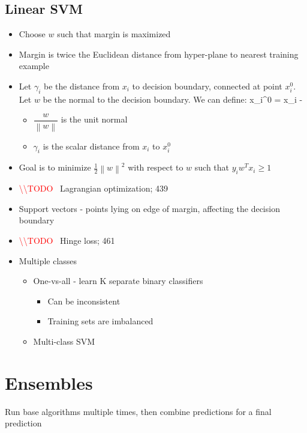 \documentclass[12pt]{article}
\newcommand{\norm}[1]{\left\lVert#1\right\rVert}
\newenvironment{eqn}{\equation\alignedat{3}}{\endalignedat\endequation}
\newcommand{\todo}[0]{\textcolor{red}{\textbackslash\textbackslash TODO \ }}
\begin{document}
\subsection{Linear SVM}

\begin{itemize}
	\item Choose $w$ such that margin is maximized
	\item Margin is twice the Euclidean distance from hyper-plane to nearest training example
	\item Let $\gamma_i$ be the distance from $x_i$ to decision boundary, connected at point $x_i^0$. Let $w$ be the normal to the decision boundary. We can define:
	\begin{eqn}
		x_i^0 = x_i - \frac{\gamma_i w}{\norm{w}}
	\end{eqn}
	\begin{itemize}
		\item $\dfrac{w}{\norm{w}}$ is the unit normal 
		\item $\gamma_i$ is the scalar distance from $x_i$ to $x_i^0$
	\end{itemize}
	\item Goal is to minimize $\frac{1}{2} \norm{w}^2$ with respect to $w$ such that $y_i w^T x_i \ge 1$ 
	\item \todo{Lagrangian optimization; 439}
	\item Support vectors - points lying on edge of margin, affecting the decision boundary
	\item \todo{Hinge loss; 461}
	\item Multiple classes 
	\begin{itemize}
		\item One-vs-all - learn K separate binary classifiers
		\begin{itemize}
			\item Can be inconsistent
			\item Training sets are imbalanced
		\end{itemize}
		\item Multi-class SVM
	\end{itemize}
\end{itemize}

\section{Ensembles}

Run base algorithms multiple times, then combine predictions for a final prediction
\end{document}
